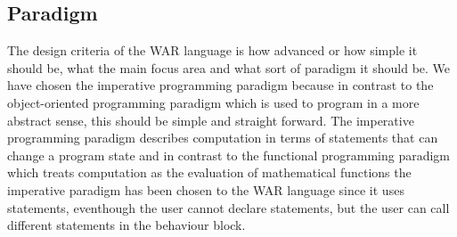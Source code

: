 \subsection{Paradigm}
The design criteria of the WAR language is how advanced or how simple it should be, what the main focus area and what sort of paradigm it should be. We have chosen the imperative programming paradigm because in contrast to the object-oriented programming paradigm which is used to program in a more abstract sense, this should be simple and straight forward. The imperative programming paradigm describes computation in terms of statements that can change a program state and in contrast to the functional programming paradigm which treats computation as the evaluation of mathematical functions the imperative paradigm has been chosen to the WAR language since it uses statements, eventhough the user cannot declare statements, but the user can call different statements in the behaviour block. 


